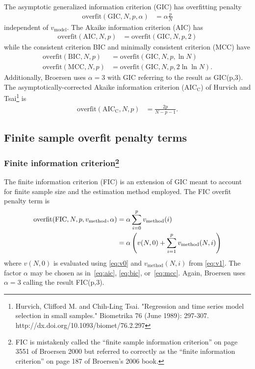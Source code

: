\documentclass[12pt,letterpaper]{article}
\begin{document}
The asymptotic generalized information criterion (GIC) has overfitting penalty
\begin{align}
    \text{overfit}\!\left(\text{GIC},N,p,\alpha\right)
    &=
    \alpha \frac{p}{N}
\end{align}
independent of $v_\text{model}$.  The Akaike information criterion
(AIC) has
\begin{align}
    \label{eq:aic}
    \text{overfit}\!\left(\text{AIC},N,p\right)
    &=
    \text{overfit}\!\left(\text{GIC},N,p,2\right)
\end{align}
while the consistent criterion BIC and minimally consistent criterion
(MCC) have
\begin{align}
    \label{eq:bic}
    \text{overfit}\!\left(\text{BIC},N,p\right)
    &=
    \text{overfit}\!\left(\text{GIC},N,p,\ln{} N\right)
    \\
    \label{eq:mcc}
    \text{overfit}\!\left(\text{MCC},N,p\right)
    &=
    \text{overfit}\!\left(\text{GIC},N,p,2\ln\ln{}N\right)
    .
\end{align}
Additionally, Broersen uses $\alpha = 3$ with GIC referring to the result as
GIC(p,3).  The asymptotically-corrected Akaike information criterion
($\text{AIC}_\text{C}$) of Hurvich and Tsai\footnote{Hurvich, Clifford M. and
Chih-Ling Tsai. "Regression and time series model selection in small samples."
Biometrika 76 (June 1989): 297-307.  http://dx.doi.org/10.1093/biomet/76.2.297}
is
\begin{align}
    \text{overfit}\!\left(\text{AIC}_\text{C},N,p\right)
    &=
    \frac{2p}{N-p-1}
    .
\end{align}

\subsection*{Finite sample overfit penalty terms}

\subsubsection*{Finite information criterion\footnote{FIC is mistakenly called
the ``finite sample information criterion'' on page 3551 of Broersen 2000 but
referred to correctly as the ``finite information criterion'' on page 187 of
Broersen's 2006 book.}}

The finite information criterion (FIC) is an extension of GIC meant to account
for finite sample size and the estimation method employed.  The FIC overfit
penalty term is
\begin{align}
    \text{overfit}\!\left(\text{FIC},N,p,v_\text{method},\alpha\right)
    &=
    \alpha \sum_{i=0}^{p} v_\text{method}\!\left(i\right)
    \notag
    \\
    &=
    \alpha\left(
      v\!\left(N,0\right)
    + \sum_{i=1}^{p} v_\text{method}\!\left(N,i\right)
    \right)
\end{align}
where $v\!\left(N,0\right)$ is evaluated using \eqref{eq:v0} and
$v_\text{method}\!\left(N,i\right)$ from \eqref{eq:v1}.  The factor $\alpha$
may be chosen as in~\eqref{eq:aic}, \eqref{eq:bic}, or~\eqref{eq:mcc}.  Again,
Broersen uses $\alpha = 3$ calling the result FIC(p,3).
\end{document}
